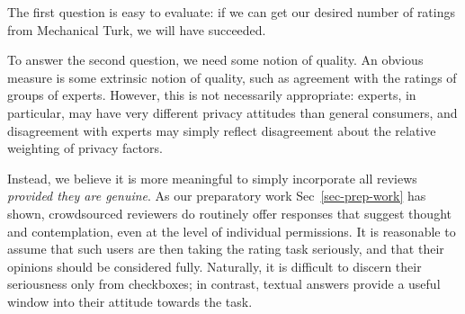 \documentclass[11pt]{article}
\begin{document}
The first question is easy to evaluate: if we can get our desired
number of ratings from Mechanical Turk, we will have succeeded. 

To answer the second question, we need some notion of quality. An
obvious measure is some extrinsic notion of quality, such as agreement
with the ratings of groups of experts. However, this is not
necessarily appropriate: experts, in particular, may have very
different privacy attitudes than general consumers, and disagreement
with experts may simply reflect disagreement about the relative
weighting of privacy factors.

Instead, we believe it is more meaningful to simply incorporate all
reviews \emph{provided they are genuine}. As our preparatory work
Sec~\ref{sec-prep-work} has shown, crowdsourced reviewers do routinely offer responses
that suggest thought and contemplation, even at the level of
individual permissions. It is reasonable to assume that such users are
then taking the rating task seriously, and that their opinions should
be considered fully. Naturally, it is difficult to discern their
seriousness only from checkboxes; in contrast, textual answers provide
a useful window into their attitude towards the task. 
\end{document}
